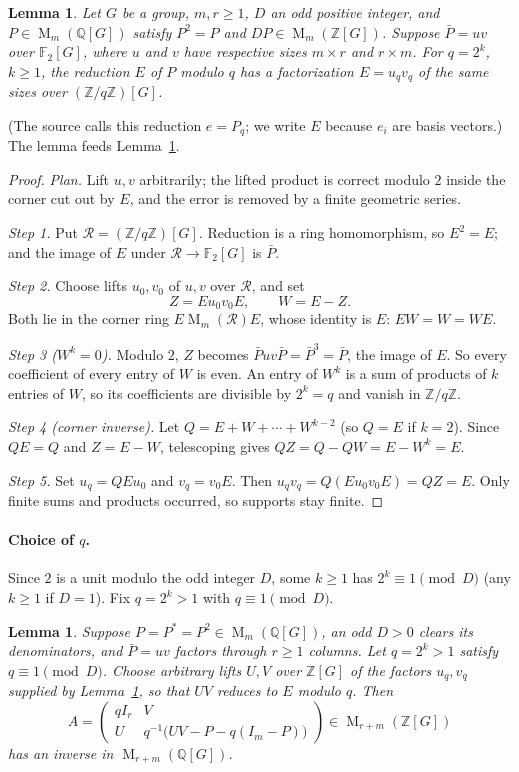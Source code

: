 \documentclass[11pt]{article}
\newtheorem{lemma}[theorem]{Lemma}
\theoremstyle{remark}
\numberwithin{equation}{section}
\newcommand{\F}{\mathbb F}
\newcommand{\Z}{\mathbb Z}
\newcommand{\Q}{\mathbb Q}
\newcommand{\Mat}{\operatorname{M}}
\begin{document}
\begin{lemma}\label{lem:lift}
Let $G$ be a group, $m,r\ge1$, $D$ an odd positive integer, and $P\in\Mat_m(\Q[G])$ satisfy $P^2=P$ and $DP\in\Mat_m(\Z[G])$. Suppose $\bar P=uv$ over $\F_2[G]$, where $u$ and $v$ have respective sizes $m\times r$ and $r\times m$. For $q=2^k$, $k\ge1$, the reduction $E$ of $P$ modulo $q$ has a factorization $E=u_qv_q$ of the same sizes over $(\Z/q\Z)[G]$.
\end{lemma}

(The source calls this reduction $e=P_q$; we write $E$ because $e_i$ are basis vectors.) The lemma feeds Lemma~\ref{lem:integral}.

\begin{proof}
\emph{Plan.} Lift $u,v$ arbitrarily; the lifted product is correct modulo $2$ inside the corner cut out by $E$, and the error is removed by a finite geometric series.

\emph{Step 1.} Put $\mathcal R=(\Z/q\Z)[G]$. Reduction is a ring homomorphism, so $E^2=E$; and the image of $E$ under $\mathcal R\to\F_2[G]$ is $\bar P$.

\emph{Step 2.} Choose lifts $u_0,v_0$ of $u,v$ over $\mathcal R$, and set
\[
 Z=Eu_0v_0E,\qquad W=E-Z.
\]
Both lie in the corner ring $E\Mat_m(\mathcal R)E$, whose identity is $E$: $EW=W=WE$.

\emph{Step 3 ($W^k=0$).} Modulo $2$, $Z$ becomes $\bar Puv\bar P=\bar P^3=\bar P$, the image of $E$. So every coefficient of every entry of $W$ is even. An entry of $W^k$ is a sum of products of $k$ entries of $W$, so its coefficients are divisible by $2^k=q$ and vanish in $\Z/q\Z$.

\emph{Step 4 (corner inverse).} Let $Q=E+W+\cdots+W^{k-2}$ (so $Q=E$ if $k=2$). Since $QE=Q$ and $Z=E-W$, telescoping gives $QZ=Q-QW=E-W^k=E$.

\emph{Step 5.} Set $u_q=QEu_0$ and $v_q=v_0E$. Then $u_qv_q=Q(Eu_0v_0E)=QZ=E$. Only finite sums and products occurred, so supports stay finite.
\end{proof}

\paragraph{Choice of $q$.}
Since $2$ is a unit modulo the odd integer $D$, some $k\ge1$ has $2^k\equiv1\pmod D$ (any $k\ge1$ if $D=1$). Fix $q=2^k>1$ with $q\equiv1\pmod D$.

\begin{lemma}\label{lem:integral}
Suppose $P=P^*=P^2\in\Mat_m(\Q[G])$, an odd $D>0$ clears its denominators, and $\bar P=uv$ factors through $r\ge1$ columns. Let $q=2^k>1$ satisfy $q\equiv1\pmod D$. Choose arbitrary lifts $U,V$ over $\Z[G]$ of the factors $u_q,v_q$ supplied by Lemma~\ref{lem:lift}, so that $UV$ reduces to $E$ modulo $q$. Then
\begin{equation}\label{eq:integral-matrix}
 A=\begin{pmatrix}
 qI_r&V\\
 U&q^{-1}\bigl(UV-P-q(I_m-P)\bigr)
 \end{pmatrix}
 \in\Mat_{r+m}(\Z[G])
\end{equation}
has an inverse in $\Mat_{r+m}(\Q[G])$.
\end{lemma}
\end{document}
